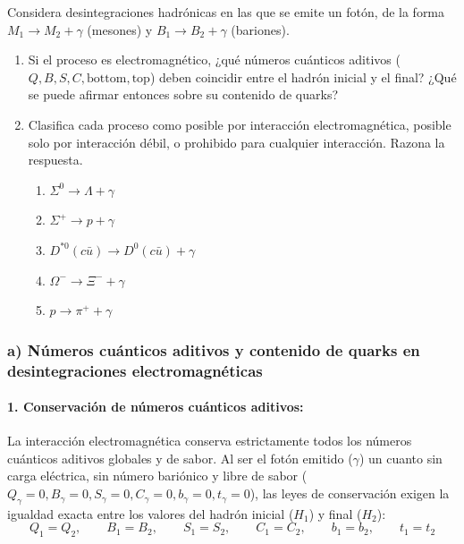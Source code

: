 \newpage
\begin{problema}
Considera desintegraciones hadrónicas en las que se emite un fotón, de la forma $M_1 \rightarrow M_2 + \gamma$ (mesones) y $B_1 \rightarrow B_2 + \gamma$ (bariones).

\begin{enumerate}[label=\alph*)]
    \item Si el proceso es electromagnético, ¿qué números cuánticos aditivos ($Q, B, S, C, \text{bottom}, \text{top}$) deben coincidir entre el hadrón inicial y el final? ¿Qué se puede afirmar entonces sobre su contenido de quarks?
    \item Clasifica cada proceso como posible por interacción electromagnética, posible solo por interacción débil, o prohibido para cualquier interacción. Razona la respuesta.
    \begin{enumerate}[label=\roman*)]
        \item $\Sigma^0 \longrightarrow \Lambda + \gamma$
        \item $\Sigma^+ \longrightarrow p + \gamma$
        \item $D^{*0} (c\bar{u}) \longrightarrow D^0 (c\bar{u}) + \gamma$
        \item $\Omega^- \longrightarrow \Xi^- + \gamma$
        \item $p \longrightarrow \pi^+ + \gamma$
    \end{enumerate}
\end{enumerate}

\tcblower

\subsubsection*{a) Números cuánticos aditivos y contenido de quarks en desintegraciones electromagnéticas}

\paragraph{1. Conservación de números cuánticos aditivos:}
La interacción electromagnética conserva estrictamente todos los números cuánticos aditivos globales y de sabor. Al ser el fotón emitido ($\gamma$) un cuanto sin carga eléctrica, sin número bariónico y libre de sabor ($Q_\gamma = 0, B_\gamma = 0, S_\gamma = 0, C_\gamma = 0, b_\gamma = 0, t_\gamma = 0$), las leyes de conservación exigen la igualdad exacta entre los valores del hadrón inicial ($H_1$) y final ($H_2$):
\begin{equation*}
Q_1 = Q_2, \qquad B_1 = B_2, \qquad S_1 = S_2, \qquad C_1 = C_2, \qquad b_1 = b_2, \qquad t_1 = t_2
\end{equation*}


\end{problema}
